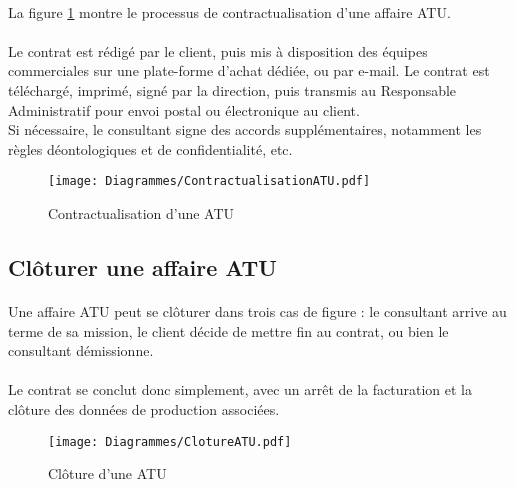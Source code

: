 \paragraph{} La figure \ref{contractATU} montre le processus de contractualisation d'une affaire ATU.
\paragraph{} Le contrat est rédigé par le client, puis mis à disposition des équipes commerciales sur une plate-forme d'achat dédiée, ou par e-mail. Le contrat est téléchargé, imprimé, signé par la direction, puis transmis au Responsable Administratif pour envoi postal ou électronique au client.\\
Si nécessaire, le consultant signe des accords supplémentaires, notamment les règles déontologiques et de confidentialité, etc.
\begin{figure}[H]
	\centering
	\texttt{[image: Diagrammes/ContractualisationATU.pdf]}
	\caption{Contractualisation d'une ATU} 
	\label{contractATU}
\end{figure}

\subsection{Clôturer une affaire ATU}

\paragraph{} Une affaire ATU peut se clôturer dans trois cas de figure : le consultant arrive au terme de sa mission, le client décide de mettre fin au contrat, ou bien le consultant démissionne.
\paragraph{} Le contrat se conclut donc simplement, avec un arrêt de la facturation et la clôture des données de production associées.

\begin{figure}[H]
	\centering
	\texttt{[image: Diagrammes/ClotureATU.pdf]}
	\caption{Clôture d'une ATU} 
	\label{clotureATU}
\end{figure}


